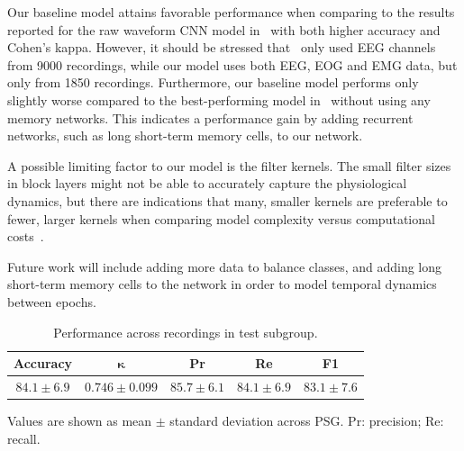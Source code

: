 Our baseline model attains favorable performance when comparing to the results reported for the raw waveform CNN model in~\cite{Biswal2017} with both higher accuracy and Cohen's kappa.
However, it should be stressed that~\cite{Biswal2017} only used \ac{EEG} channels from 9000 recordings, while our model uses both \ac{EEG}, \ac{EOG} and \ac{EMG} data, but only from 1850 recordings.
Furthermore, our baseline model performs only slightly worse compared to the best-performing model in~\cite{Biswal2017} without using any memory networks.
This indicates a performance gain by adding recurrent networks, such as long short-term memory cells, to our network.

A possible limiting factor to our model is the filter kernels.
The small filter sizes in block layers might not be able to accurately capture the physiological dynamics, but there are indications that many, smaller kernels are preferable to fewer, larger kernels when comparing model complexity versus computational costs~\cite{Szegedy2015}.

Future work will include adding more data to balance classes, and adding long short-term memory cells to the network in order to model temporal dynamics between epochs.
\begin{table}[tb]
    \small
    \centering
    \begin{threeparttable}
    \caption[MASSCv1 overall test performance, \acs{WSC}]{Performance across recordings in test subgroup.}
    \label{tab:sleep-stages:test_performance_average}
    \begin{tabular}{@{}ccccc@{}}
    \toprule
        \textbf{Accuracy}              & $\boldsymbol{\kappa}$         & \textbf{Pr}               & \textbf{Re}               & \textbf{F1}               \\ \midrule
        $ 84.1 \pm 6.9 $ & $ 0.746 \pm 0.099 $ & $ 85.7 \pm 6.1 $ & $ 84.1 \pm 6.9 $ & $ 83.1 \pm 7.6 $ \\ \bottomrule
    \end{tabular}
    \begin{tablenotes}
    \item Values are shown as mean \(\pm\) standard deviation across \acs{PSG}. Pr: precision; Re: recall.
    \end{tablenotes}
    \end{threeparttable}
\end{table}
